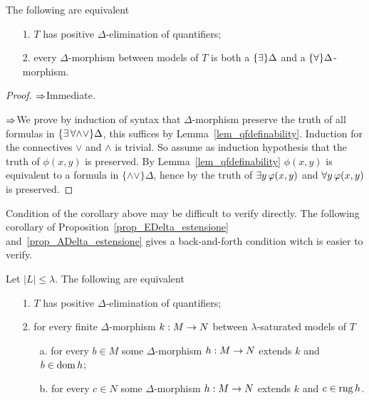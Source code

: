 \begin{corollary}\label{corol_QE}
The following are equivalent
\begin{itemize}
\item[1.] $T$ has positive $\Delta$-elimination of quantifiers;
\item[2.] every $\Delta$-morphism between models of $T$ is both a $\{\exists\}\Delta$ and a $\{\forall\}\Delta$-morphism.
\end{itemize}
\end{corollary}
\begin{proof}
$\Rightarrow$\quad Immediate.

$\Rightarrow$\quad We prove by induction of syntax that $\Delta$-morphism preserve the truth of all formulas in $\{\exists\,\forall\mathord\wedge\mathord\vee\}\Delta$, this suffices by Lemma~\ref{lem_qfdefinability}. Induction for the connectives $\vee$ and $\wedge$ is trivial.  So assume as induction hypothesis that the truth of  $\phi(x,y)$ is preserved.  By Lemma~\ref{lem_qfdefinability} $\phi(x,y)$ is equivalent to a formula in $\{\mathord\wedge\mathord\vee\}\Delta$, hence by  the truth of $\exists y\, \varphi (x,y)$ and $\forall y \,\varphi (x,y)$ is preserved.
\end{proof}

Condition  of the corollary above may be difficult to verify directly. The following corollary of Proposition~\ref{prop_EDelta_estensione} and~\ref{prop_ADelta_estensione} gives a back-and-forth condition witch is easier to verify.

\begin{corollary}\label{corol_QE_back_and_forth}
Let $|L|\le\lambda$. The following are equivalent
\begin{itemize}
\item[1.] $T$ has positive $\Delta$-elimination of quantifiers;
\item[2.] for every finite $\Delta$-morphism $k:M\rightarrow N$ between $\lambda$-saturated models of $T$
\begin{itemize}                                                                                               \item[a.] for every $b\in M$ some $\Delta$-morphism $h:M\rightarrow N$ extends $k$ and $b\in\mathop{\rm dom} h$;                                                                                \item[b.] for every $c\in N$ some $\Delta$-morphism $h:M\rightarrow N$ extends $k$ and $c\in\mathop{\rm rng} h$.\noindent\nolinebreak[4]\hfill\rlap{\ \ $\Box$}                                                                   \end{itemize}
\end{itemize}
\end{corollary}

